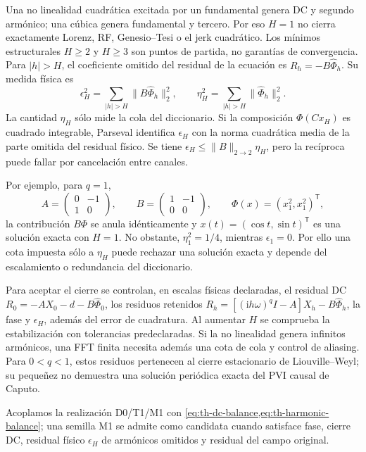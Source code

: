 Una no linealidad cuadrática excitada por un fundamental genera DC y segundo
armónico; una cúbica genera fundamental y tercero. Por eso \(H=1\) no cierra
exactamente Lorenz, RF, Genesio--Tesi o el jerk cuadrático. Los mínimos
estructurales \(H\ge2\) y \(H\ge3\) son puntos de partida, no garantías de
convergencia. Para \(|h|>H\), el coeficiente omitido del residual de la
ecuación es \(R_h=-B\widehat\Phi_h\). Su medida física es
\begin{equation}
 \epsilon_H^2=\sum_{|h|>H}\|B\widehat\Phi_h\|_2^2,
 \qquad
 \eta_H^2=\sum_{|h|>H}\|\widehat\Phi_h\|_2^2.
 \label{eq:th-physical-harmonic-tail}
\end{equation}
La cantidad \(\eta_H\) sólo mide la cola del diccionario. Si la composición
\(\Phi(Cx_H)\) es cuadrado integrable, Parseval identifica
\(\epsilon_H\) con la norma cuadrática media de la parte omitida del
residual físico. Se tiene
\(\epsilon_H\le\|B\|_{2\to2}\eta_H\), pero la recíproca puede fallar por
cancelación entre canales.

Por ejemplo, para \(q=1\),
\[
 A=\begin{pmatrix}0&-1\\1&0\end{pmatrix},\qquad
 B=\begin{pmatrix}1&-1\\0&0\end{pmatrix},\qquad
 \Phi(x)=(x_1^2,x_1^2)^{\mathsf T},
\]
la contribución \(B\Phi\) se anula idénticamente y
\(x(t)=(\cos t,\sin t)^{\mathsf T}\) es una solución exacta con \(H=1\).
No obstante, \(\eta_1^2=1/4\), mientras \(\epsilon_1=0\). Por ello una
cota impuesta sólo a \(\eta_H\) puede rechazar una solución exacta y depende
del escalamiento o redundancia del diccionario.

Para aceptar el cierre se controlan, en escalas físicas declaradas, el
residual DC \(R_0=-AX_0-d-B\widehat\Phi_0\), los residuos retenidos
\(R_h=[(\mathrm ih\omega)^qI-A]X_h-B\widehat\Phi_h\), la fase y
\(\epsilon_H\), además del error de cuadratura. Al aumentar \(H\) se
comprueba la estabilización con tolerancias predeclaradas. Si la no linealidad
genera infinitos armónicos, una FFT finita necesita además una cota de cola y
control de aliasing. Para \(0<q<1\), estos residuos pertenecen al cierre
estacionario de Liouville--Weyl; su pequeñez no demuestra una solución
periódica exacta del PVI causal de Caputo.

Acoplamos la realización D0/T1/M1 con
\cref{eq:th-dc-balance,eq:th-harmonic-balance}; una semilla M1 se admite como
candidata cuando satisface fase, cierre DC, residual físico \(\epsilon_H\) de
armónicos omitidos y
residual del campo original.

